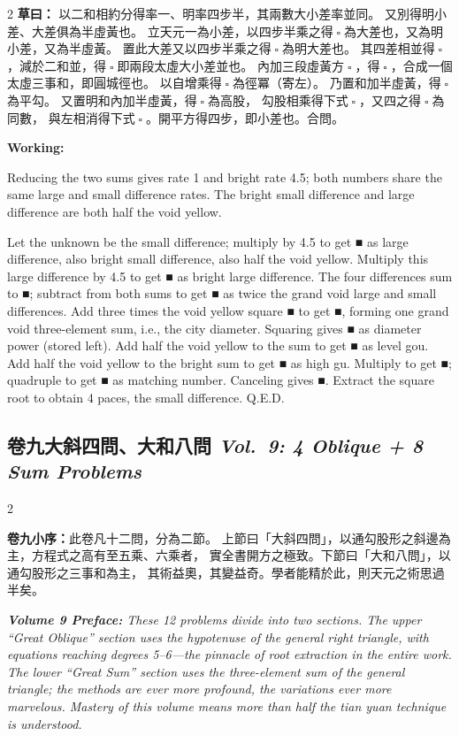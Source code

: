 \documentclass[11pt,a4paper]{article}
\let\origsquare\square
\renewcommand{\square}{\ensuremath{\origsquare}}%
\newcommand{\tsaoyue}[1]{%
  \noindent\textcolor{workcolor}{\textbf{草曰：}}{\tradfont #1}\par%
}
\newcommand{\tsaoyueeng}[1]{%
  \noindent\textcolor{engcolor}{\textbf{Working: }}{\small #1}\par%
}
\newcommand{\bilingsubsec}[2]{%
  \subsection{\tradfont #1 \hfill\normalfont\normalsize\textit{#2}}%
}
\newcommand{\cnpar}[1]{{\tradfont #1\par}}
\newcommand{\enpar}[1]{{\itshape #1\par}}
\begin{document}
\begin{paracol}{2}
\tsaoyue{%
以二和相約分得率一、明率四步半，其兩數大小差率並同。
又別得明小差、大差俱為半虛黃也。
立天元一為小差，以四步半乘之得$ \; \square \; $為大差也，又為明小差，又為半虛黃。
置此大差又以四步半乘之得$ \; \square \; $為明大差也。
其四差相並得$ \; \square \; $，減於二和並，得$ \; \square \; $即兩段太虛大小差並也。
內加三段虛黃方$ \; \square \; $，得$ \; \square \; $，合成一個太虛三事和，即圓城徑也。
以自增乘得$ \; \square \; $為徑冪（寄左）。
乃置和加半虛黃，得$ \; \square \; $為平勾。
又置明和內加半虛黃，得$ \; \square \; $為高股，
勾股相乘得下式$ \; \square \; $，又四之得$ \; \square \; $為同數，
與左相消得下式$ \; \square \; $。開平方得四步，即小差也。合問。}
\switchcolumn
\tsaoyueeng{%
Reducing the two sums gives rate 1 and bright rate 4.5; both numbers share the same large and small difference rates. The bright small difference and large difference are both half the void yellow.

Let the unknown be the small difference; multiply by 4.5 to get ■ as large difference, also bright small difference, also half the void yellow. Multiply this large difference by 4.5 to get ■ as bright large difference. The four differences sum to ■; subtract from both sums to get ■ as twice the grand void large and small differences. Add three times the void yellow square ■ to get ■, forming one grand void three-element sum, i.e., the city diameter. Squaring gives ■ as diameter power (stored left). Add half the void yellow to the sum to get ■ as level gou. Add half the void yellow to the bright sum to get ■ as high gu. Multiply to get ■; quadruple to get ■ as matching number. Canceling gives ■. Extract the square root to obtain 4 paces, the small difference. Q.E.D.}
\end{paracol}

\vspace{0.5cm}

\newpage
\bilingsubsec{卷九\quad 大斜四問、大和八問}{Vol.~9: 4 Oblique + 8 Sum Problems}

\begin{paracol}{2}
\cnpar{%
\noindent\textbf{卷九小序：}此卷凡十二問，分為二節。
上節曰「大斜四問」，以通勾股形之斜邊為主，方程式之高有至五乘、六乘者，
實全書開方之極致。下節曰「大和八問」，以通勾股形之三事和為主，
其術益奧，其變益奇。學者能精於此，則天元之術思過半矣。}

\switchcolumn

\enpar{%
\noindent\textbf{Volume 9 Preface:} These 12 problems divide into two sections. The upper ``Great Oblique'' section uses the hypotenuse of the general right triangle, with equations reaching degrees 5--6---the pinnacle of root extraction in the entire work. The lower ``Great Sum'' section uses the three-element sum of the general triangle; the methods are ever more profound, the variations ever more marvelous. Mastery of this volume means more than half the \textit{tian yuan} technique is understood.}

\end{paracol}
\end{document}
